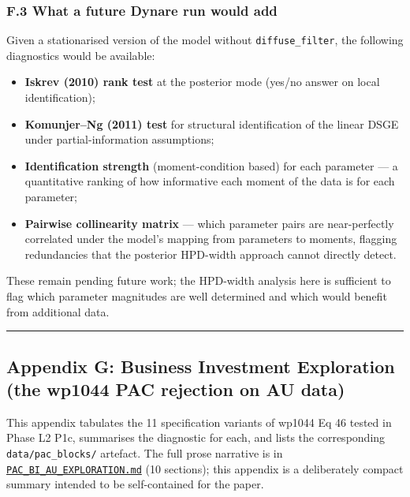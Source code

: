 \documentclass[
]{article}
\providecommand{\tightlist}{%
  \setlength{\itemsep}{0pt}\setlength{\parskip}{0pt}}
\begin{document}
\subsubsection{F.3 What a future Dynare run would
add}\label{f.3-what-a-future-dynare-run-would-add}

Given a stationarised version of the model without
\texttt{diffuse\_filter}, the following diagnostics would be available:

\begin{itemize}
\tightlist
\item
  \textbf{Iskrev (2010) rank test} at the posterior mode (yes/no answer
  on local identification);
\item
  \textbf{Komunjer--Ng (2011) test} for structural identification of the
  linear DSGE under partial-information assumptions;
\item
  \textbf{Identification strength} (moment-condition based) for each
  parameter --- a quantitative ranking of how informative each moment of
  the data is for each parameter;
\item
  \textbf{Pairwise collinearity matrix} --- which parameter pairs are
  near-perfectly correlated under the model's mapping from parameters to
  moments, flagging redundancies that the posterior HPD-width approach
  cannot directly detect.
\end{itemize}

These remain pending future work; the HPD-width analysis here is
sufficient to flag which parameter magnitudes are well determined and
which would benefit from additional data.

\begin{center}\rule{0.5\linewidth}{0.5pt}\end{center}

\subsection{Appendix G: Business Investment Exploration (the wp1044 PAC
rejection on AU
data)}\label{appendix-g-business-investment-exploration-the-wp1044-pac-rejection-on-au-data}

This appendix tabulates the 11 specification variants of wp1044 Eq 46
tested in Phase L2 P1c, summarises the diagnostic for each, and lists
the corresponding \texttt{data/pac\_blocks/} artefact. The full prose
narrative is in
\href{../PAC_BI_AU_EXPLORATION.md}{\texttt{PAC\_BI\_AU\_EXPLORATION.md}}
(10 sections); this appendix is a deliberately compact summary intended
to be self-contained for the paper.
\end{document}
